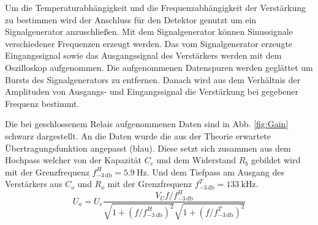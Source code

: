 Um die Temperaturabhängigkeit und die Frequenzabhängigkeit der Verstärkung zu bestimmen wird der Anschluss für den Detektor genutzt um ein Signalgenerator anzuschließen.
Mit dem Signalgenerator können Sinussignale verschiedener Frequenzen erzeugt werden.
Das vom Signalgenerator erzeugte Eingangssignal sowie das Ausgangssignal des Verstärkers werden mit dem Oszilloskop aufgenommen.
Die aufgenommenen Datenspuren werden geglättet um Bursts des Signalgenerators zu entfernen.
Danach wird aus dem Verhältnis der Amplituden von Ausgangs- und Eingangssignal die Verstärkung bei gegebener Frequenz bestimmt.

Die bei geschlossenem Relais aufgenommenen Daten sind in Abb. \ref{fig:Gain} schwarz dargestellt.
An die Daten wurde die aus der Theorie erwartete Übertragungsfunktion angepasst (blau).
Diese setzt sich zusammen aus dem Hochpass welcher von der Kapazität $C_c$ und dem Widerstand $R_b$ gebildet wird mit der Grenzfrequenz $f^H_{-3\,\mathrm{db}} = \SI{5.9}{\hertz}$.
Und dem Tiefpass am Ausgang des Verstärkers aus $C_o$ und $R_o$ mit der Grenzfrequenz $f^T_{-3\,\mathrm{db}} = \SI{133}{\kilo\hertz}$.
\begin{equation}
U_a = U_e \frac{V_Uf/f^H_{{-3\,\mathrm{{db}}}}}{\sqrt{1+(f/f^H_{-3\,\mathrm{db}})^2}\sqrt{1+(f/f^T_{-3\,\mathrm{db}})^2}}
\end{equation}

